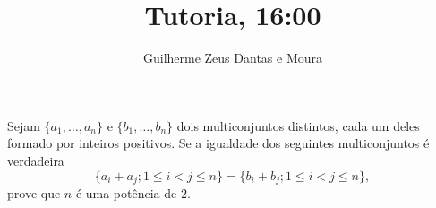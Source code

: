 \documentclass[10pt,a4paper]{article}
\title{Tutoria, 16:00}
\author{Guilherme Zeus Dantas e Moura}
\begin{document}
	
 	\zeustitle


	\begin{prob}%
		Sejam $\{a_1, \dots, a_n\}$ e $\{b_1, \dots,b_n\}$ dois multiconjuntos distintos, cada um deles formado por inteiros positivos.
		Se a igualdade dos seguintes multiconjuntos é verdadeira \[\{a_i+a_j; 1 \leq i<j \leq n\} = \{b_i+b_j; 1 \leq i<j \leq n\},\] prove que $n$ é uma potência de $2$.
	\end{prob}
\end{document}
